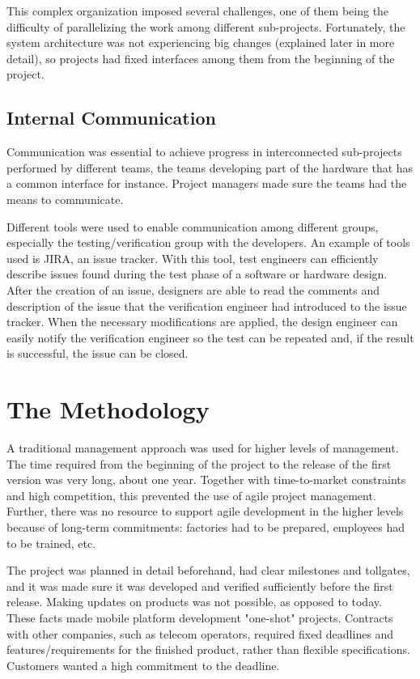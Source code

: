 \documentclass[conference]{IEEEtran}
\begin{document}
This complex organization imposed several challenges, one of them being the difficulty of parallelizing the work among different sub-projects. Fortunately, the system architecture was not experiencing big changes (explained later in more detail), so projects had fixed interfaces among them from the beginning of the project.

\subsection{Internal Communication}
Communication was essential to achieve progress in interconnected sub-projects performed by different teams, the teams developing part of the hardware that has a common interface for instance. Project managers made sure the teams had the means to communicate. 

Different tools were used to enable communication among different groups, especially the testing/verification group with the developers. An example of tools used is JIRA, an issue tracker. With this tool, test engineers can efficiently describe issues found during the test phase of a software or hardware design. After the creation of an issue, designers are able to read the comments and description of the issue that the verification engineer had introduced to the issue tracker. When the necessary modifications are applied, the design engineer can easily notify the verification engineer so the test can be repeated and, if the result is successful, the issue can be closed.

\section{The Methodology}
A traditional management approach was used for higher levels of management. The time required from the beginning of the project to the release of the first version was very long, about one year. Together with time-to-market constraints and high competition, this prevented the use of agile project management. Further, there was no resource to support agile development in the higher levels because of long-term commitments: factories had to be prepared, employees had to be trained, etc. 

The project was planned in detail beforehand, had clear milestones and tollgates, and it was made sure it was developed and verified sufficiently before the first release. Making updates on products was not possible, as opposed to today. These facts made mobile platform development "one-shot" projects. Contracts with other companies, such as telecom operators, required fixed deadlines and features/requirements for the finished product, rather than flexible specifications. Customers wanted a high commitment to the deadline.
\end{document}

